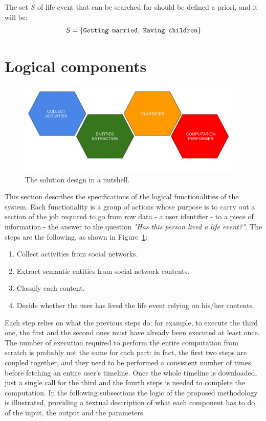 The set $S$ of life event that can be searched for should be defined a priori, and it will be: 
\[
S = \{\text{\texttt{Getting married}}, \text{ \texttt{Having children}}\}
\]

\section{Logical components}
\label{sec:logicdescr}

\begin{figure}
\centering
\includegraphics[width=%
0.95\textwidth]{img/Solutiondesign_nutshell}
\caption{The solution design in a nutshell.}
\label{fig:nutshell}
\end{figure}

This section describes the specifications of the logical functionalities of the system. Each functionality is a group of actions whose purpose is to carry out a section of the job required to go from row data - a user identifier - to a piece of information - the answer to the question \textit{"Has this person lived a life event?"}. The steps are the following, as shown in Figure~\ref{fig:nutshell}:
\begin{enumerate}
\item Collect activities from social networks.
\item Extract semantic entities from social network contents.
\item Classify each content.
\item Decide whether the user has lived the life event relying on his/her contents.
\end{enumerate}
Each step relies on what the previous steps do: for example, to execute the third one, the first and the second ones must have already been executed at least once. The number of execution required to perform the entire computation from scratch is probably not the same for each part: in fact, the first two steps are coupled together, and they need to be performed a consistent number of times before fetching an entire user's timeline. Once the whole timeline is downloaded, just a single call for the third and the fourth steps is needed to complete the computation. In the following subsections the logic of the proposed methodology is illustrated, providing a textual description of what each component has to do, of the input, the output and the parameters. 

